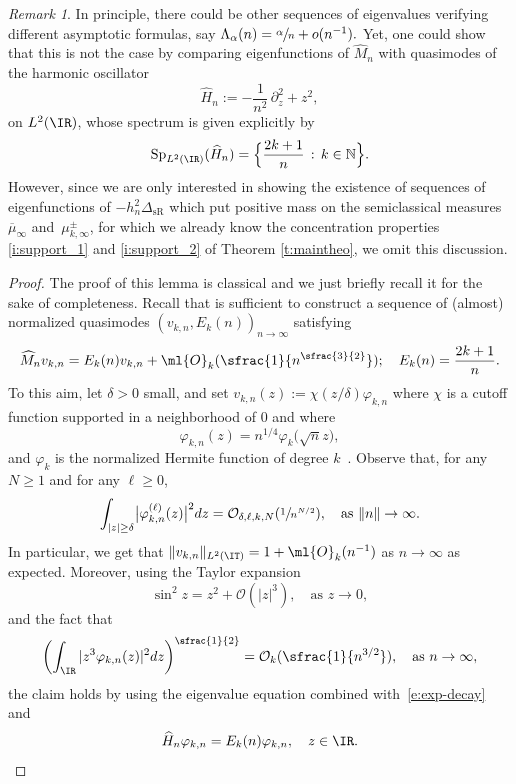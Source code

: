 \documentclass[10pt]{amsart}
\theoremstyle{plain}
\theoremstyle{definition}
\theoremstyle{remark}
\newtheorem{rema}[theo]{Remark}
\begin{document}
\begin{rema} In principle, there could be other sequences of eigenvalues verifying different asymptotic formulas, say $\Lambda_\alpha(n)=\sfrac{\alpha}{n}+o(n^{-1}).$ Yet, one could show that this is not the case by comparing eigenfunctions of $\widehat{M}_n$ with quasimodes of the harmonic oscillator
\begin{equation}
\widehat{H}_n := - \frac{1}{ n^2}\, \partial_z^2 + z^2,
\end{equation}
on $L^2(\IR)$, whose spectrum is given explicitly by
\[
\operatorname{Sp}_{L^2(\IR)}(\widehat{H}_n) = \Bigl \{ \frac{2k+1}{n } \, : \, k \in \mathbb{N} \Bigr \}.
\]
However, since we are only interested in showing the existence of sequences of eigenfunctions of $-h_n^2 \Delta_{\operatorname{sR}}$ which put positive mass on the semiclassical measures $\overline{\mu}_\infty$ and~$\mu_{k,\infty}^\pm$, for which we already know the concentration properties \eqref{i:support_1} and \eqref{i:support_2} of Theorem \ref{t:maintheo}, we omit this discussion.
\end{rema}

\begin{proof}
The proof of this lemma is classical and we just briefly recall it for the sake of completeness. Recall that is sufficient to construct a sequence of (almost) normalized quasimodes $(v_{k,n}, E_k(n))_{n\to \infty}$ satisfying
\[
\widehat{M}_n v_{k,n} = E_k(n) v_{k,n} + \ml{O}_k(\sfrac{1}{n^{\sfrac{3}{2}}}); \quad E_k(n) = \frac{2k+1}{ n}.
\]
To this aim, let $\delta > 0$ small, and set $v_{k,n}(z) := \chi(z/\delta)\varphi_{k,n}$ where $\chi$ is a cutoff function supported in a neighborhood of $0$ and where
\[
\varphi_{k,n}(z) = n^{1/4} \varphi_k\big(\sqrt{n}z \big),
\]
and $\varphi_k$ is the normalized Hermite function of degree $k$~\cite[Th.\,6.2]{Zworski12}. Observe that, for any $N \geq 1$ and for any $\ell\geq 0$,
\begin{equation}\label{e:exp-decay}
\int_{|z|\geq \delta}\bigl|\varphi_{k,n}^{(\ell)}(z)\bigr|^2dz = \mathcal{O}_{\delta,\ell,k,N}(\sfrac{1}{ n^{N/2}}), \quad \text{as } \|n\| \to \infty.
\end{equation}
In particular, we get that $\|v_{k,n}\|_{L^2(\IT)}=1+\ml{O}_k(n^{-1})$ as $n\to\infty$ as expected. Moreover, using the Taylor expansion
\[
\sin^2z = z^2 + \mathcal{O}(\vert z \vert^3), \quad \text{as } z \to 0,
\]
and the fact that
\[
\left(\int_{\IR}|z^3\varphi_{k,n}(z)|^2 dz\right)^{\sfrac{1}{2}} = \mathcal{O}_k(\sfrac{1}{n^{3/2}}), \quad \text{as } n\to\infty,
\]
the claim holds by using the eigenvalue equation combined with~\eqref{e:exp-decay} and
\[
\widehat{H}_n \varphi_{k,n} = E_{k}(n) \varphi_{k,n}, \quad z \in \IR.\qedhere
\]
\end{proof}
\end{document}
